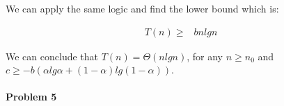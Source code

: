 \documentclass[11pt]{article}
\begin{document}
\begin{flushleft}
    We can apply the same logic and find the lower bound which is:
\end{flushleft}
\begin{equation*}
\begin {split}
    T(n)    \geq & bnlgn 
\end {split}
\end{equation*}
\begin{flushleft}
    We can conclude that $T(n)=\Theta(nlgn)$, for any $n \geq n_0$ and $c \geq -b(\alpha lg \alpha + (1- \alpha) lg(1 - \alpha))$.
\end{flushleft}
\paragraph{\noindent\textbf{\LARGE{Problem 5}}}
\end{document}
